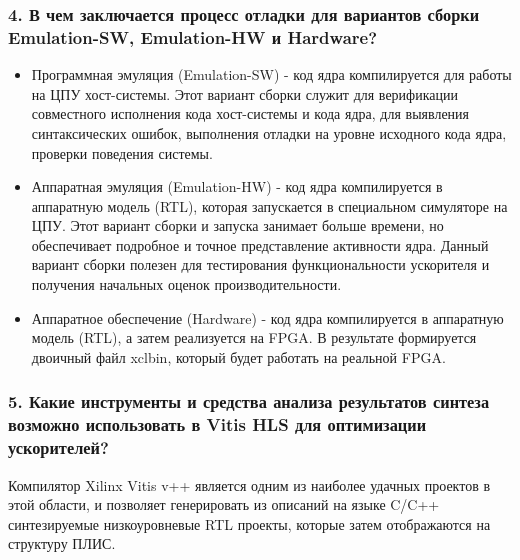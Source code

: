 \subsubsection{4. В чем заключается процесс отладки для вариантов сборки Emulation-SW, Emulation-HW и Hardware?}

\begin{itemize}
	\item Программная эмуляция (Emulation-SW) - код ядра компилируется для работы на ЦПУ хост-системы. Этот вариант сборки служит для верификации совместного исполнения кода хост-системы и кода ядра, для выявления синтаксических ошибок, выполнения отладки на уровне исходного кода ядра, проверки поведения системы.
	\item Аппаратная эмуляция (Emulation-HW) - код ядра компилируется в аппаратную модель (RTL), которая запускается в специальном симуляторе на ЦПУ. Этот вариант сборки и запуска занимает больше времени, но обеспечивает подробное и точное представление активности ядра. Данный вариант сборки полезен для тестирования функциональности ускорителя и получения начальных оценок производительности.
	\item Аппаратное обеспечение (Hardware) - код ядра компилируется в аппаратную модель (RTL), а затем реализуется на FPGA. В результате формируется двоичный файл xclbin, который будет работать на реальной FPGA.
\end{itemize}

\subsubsection{5. Какие инструменты и средства анализа результатов синтеза возможно использовать в Vitis HLS для оптимизации ускорителей?}

Компилятор Xilinx Vitis v++ является одним из наиболее удачных проектов в этой области, и позволяет генерировать из описаний на языке C/C++ синтезируемые низкоуровневые RTL проекты, которые затем отображаются на структуру ПЛИС. 

